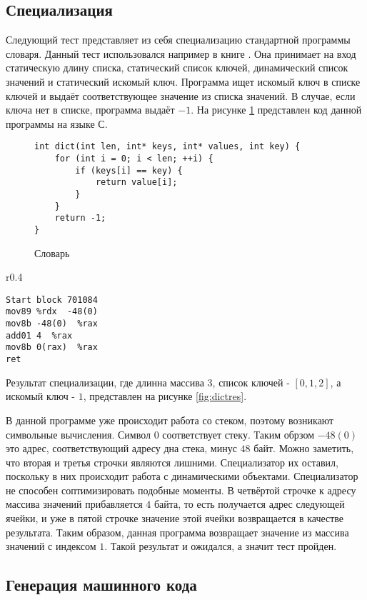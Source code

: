 \subsection{ Специализация}
Следующий тест представляет из себя специализацию стандартной программы словаря. Данный тест использовался например в книге \cite{PEAPG}. Она принимает на вход статическую длину списка, статический список ключей, динамический список значений и статический искомый ключ. Программа ищет искомый ключ в списке ключей и выдаёт соответствующее значение из списка значений. В случае, если ключа нет в списке, программа выдаёт $-1$. На рисунке \ref{fig:dict} представлен код данной программы на языке С.
\begin{figure}[h]
\begin{lstlisting}[xleftmargin = 20pt]
int dict(int len, int* keys, int* values, int key) {
    for (int i = 0; i < len; ++i) {
        if (keys[i] == key) {
            return value[i];
        }
    }
    return -1;
}
\end{lstlisting}
\caption{ Словарь}
\label{fig:dict}
\end{figure}
\begin{wrapfigure}{r}{0.4\textwidth}
\begin{lstlisting}[xleftmargin = 20pt]
Start block 701084
mov89 %rdx  -48(0) 
mov8b -48(0)  %rax 
add01 4  %rax 
mov8b 0(rax)  %rax 
ret
\end{lstlisting}
\caption{ Результат специализации}
\label{fig:dictres}
\end{wrapfigure}
Результат специализации, где длинна массива $3$, список ключей - $[0, 1, 2]$, а искомый ключ - $1$, представлен на рисунке \ref{fig:dictres}.

В данной программе уже происходит работа со стеком, поэтому возникают символьные вычисления. Символ $0$ соответствует стеку. Таким обрзом $-48(0)$ это адрес, соответствующий адресу дна стека, минус $48$ байт. Можно заметить, что вторая и третья строчки являются лишними. Специализатор их оставил, поскольку в них происходит работа с динамическими объектами. Специализатор не способен соптимизировать подобные моменты. В четвёртой строчке к адресу массива значений прибавляется $4$ байта, то есть получается адрес следующей ячейки, и уже в пятой строчке значение этой ячейки возвращается в качестве результата. Таким образом, данная программа возвращает значение из массива значений с индексом $1$. Такой результат и ожидался, а значит тест пройден.

\subsection{ Генерация машинного кода}

